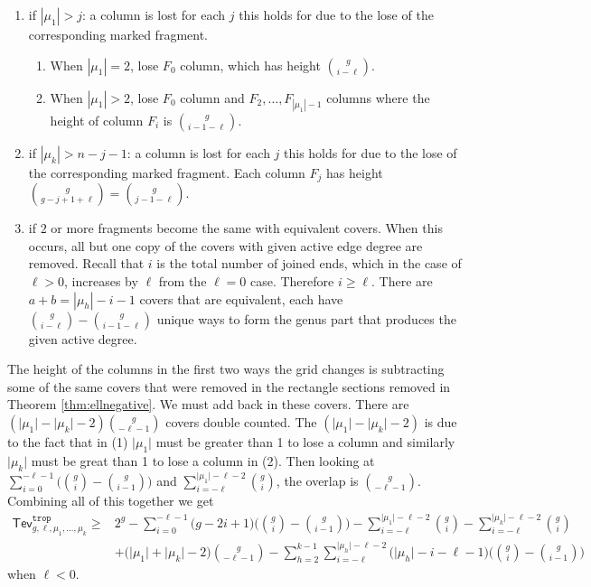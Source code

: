 \documentclass[11pt,reqno]{amsart}
\theoremstyle{definition}
\newcommand\trop{{\mathtt{trop}}}
\newcommand{\Tev}{{\mathsf{Tev}}}
\begin{document}
 \begin{enumerate}
    \item if $|\mu_1|>j$: a column is lost for each $j$ this holds for due to the lose of the corresponding marked fragment. 
    \begin{enumerate}
        \item When $|\mu_1|=2$, lose $F_0$ column, which has height ${{g}\choose{i-\ell}}$.
        \item When $|\mu_1|>2$, lose $F_0$ column and $F_2,\dots,F_{|\mu_1|-1}$ columns where the height of column $F_i$ is ${{g}\choose{i-1-\ell}}$.
    \end{enumerate}
     \item if $|\mu_k|>n-j-1$: a column is lost for each $j$ this holds for due to the lose of the corresponding marked fragment. Each column $F_j$ has height ${{g}\choose{g-j+1+\ell}}={{g}\choose{j-1-\ell}}$.
    \item if $2$ or more fragments become the same with equivalent covers. When this occurs, all but one copy of the covers with given active edge degree are removed. Recall that $i$ is the total number of joined ends, which in the case of $\ell>0$, increases by $\ell$ from the $\ell=0$ case. Therefore $i\geq\ell$. There are $a+b=|\mu_h|-i-1$ covers that are equivalent, each have ${{g}\choose{i-\ell}}-{{g}\choose{i-1-\ell}}$ unique ways to form the genus part that produces the given active degree.
\end{enumerate}

The height of the columns in the first two ways the grid changes is subtracting some of the same covers that were removed in the rectangle sections removed in Theorem \ref{thm:ellnegative}. We must add back in these covers. There are $(\lvert\mu_1\rvert-\lvert\mu_k\rvert-2){g\choose-\ell-1}$ covers double counted. The $(\lvert\mu_1\rvert-\lvert\mu_k\rvert-2)$ is due to the fact that in (1) $\lvert\mu_1\rvert$ must be greater than 1 to lose a column and similarly $\lvert\mu_k\rvert$ must be great than 1 to lose a column in (2). Then looking at $\sum_{i=0}^{-\ell-1}\bigg({g\choose i}-{g \choose i-1}\bigg)$ and $\sum_{i=-\ell}^{\lvert\mu_1\rvert-\ell-2}{g\choose i}$, the overlap is ${g\choose-\ell-1}$. Combining all of this together we get 
\begin{align*}
        \Tev^\trop_{g,\ell,\mu_1,\dots,\mu_k}\geq&2^g - \sum_{i=0}^{-\ell-1}\bigg(g-2i+1\bigg)\bigg({g\choose i}-{g \choose i-1}\bigg)-\sum_{i=-\ell}^{\lvert\mu_1\rvert-\ell-2}{g\choose i}-\sum_{i=-\ell}^{\lvert\mu_k\rvert-\ell-2}{g\choose i}\\&+\bigg(\lvert\mu_1\rvert+\lvert\mu_k\rvert-2\bigg){g\choose-\ell-1}-\sum_{h=2}^{k-1}\sum_{i=-\ell}^{\lvert\mu_h\rvert-\ell-2}\bigg(\lvert\mu_h\rvert-i-\ell-1\bigg)\bigg({g\choose i}-{g \choose i-1}\bigg)
    \end{align*}
when $\ell<0$. 
     \vspace{0.5em}
     
\end{document}

